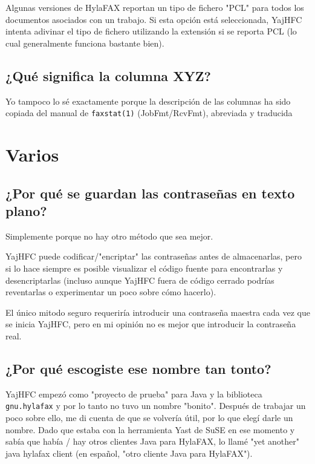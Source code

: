 \documentclass[a4paper,10pt]{scrartcl}
\begin{document}
Algunas versiones de HylaFAX reportan 
un tipo de fichero "PCL" para todos los documentos asociados con un trabajo. 
Si esta opción está seleccionada, YajHFC intenta adivinar el tipo de fichero 
utilizando la extensión si se reporta PCL (lo cual generalmente funciona bastante bien).

\subsection{¿Qué significa la columna XYZ?}

Yo tampoco lo sé exactamente porque la descripción de las columnas ha sido copiada del manual de  \verb#faxstat(1)# (JobFmt/RcvFmt), abreviada y traducida

\section{Varios}

\subsection{¿Por qué se guardan las contraseñas en texto plano?}

Simplemente porque no hay otro método que sea mejor.


YajHFC puede codificar/"encriptar" las contraseñas antes de almacenarlas, 
pero si lo hace siempre es posible visualizar el código fuente para encontrarlas 
y desencriptarlas (incluso aunque YajHFC fuera de código cerrado podrías reventarlas o experimentar un poco sobre cómo hacerlo).


El único mitodo seguro requeriría introducir una contraseña maestra cada vez que se inicia YajHFC, pero en mi opinión no es mejor que introducir la contraseña real.


\subsection{¿Por qué escogiste ese nombre tan tonto?}

YajHFC empezó como "proyecto de prueba" para Java y la biblioteca \texttt{gnu.hylafax}
y por lo tanto no tuvo un nombre "bonito". Después de trabajar un poco sobre ello, me di cuenta de que se volvería útil, por lo que elegí darle un nombre.
Dado que estaba con la herramienta Yast de SuSE en ese momento y sabía 
que había / hay otros clientes Java para HylaFAX, lo llamé "yet another" java hylafax client (en español, "otro cliente Java para HylaFAX").
 
\end{document}
